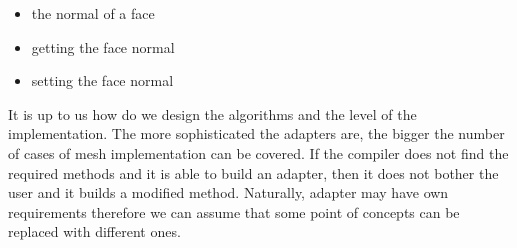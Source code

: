 \begin{itemize}
\item the normal of a face
\item getting the face normal
\item setting the face normal
\end{itemize}
It is up to us how do we design the algorithms and the level of the implementation. The more sophisticated
the adapters are, the bigger the number of cases of mesh implementation can be covered. If the compiler does not
find the required methods and it is able to build an adapter, then it does not bother the user and it builds
a modified method. Naturally, adapter may have own requirements therefore we can assume that
some point of concepts can be replaced with different ones.